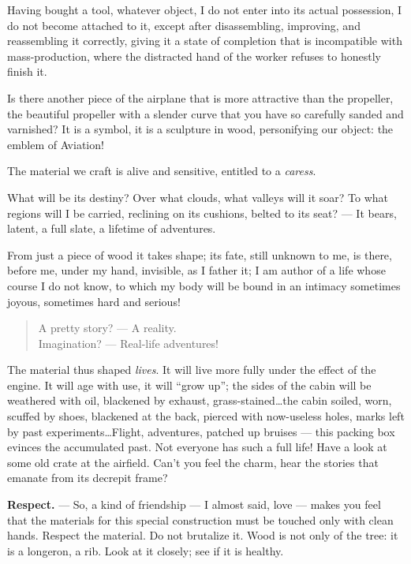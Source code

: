 \documentclass{book}
\begin{document}
Having bought a tool, whatever object, I do not enter into its actual
possession, I do not become attached to it, except after
disassembling, improving, and reassembling it correctly, giving it a
state of completion that is incompatible with mass-production, where
the distracted hand of the worker refuses to honestly finish it.

Is there another piece of the airplane that is more attractive than
the propeller, the beautiful propeller with a slender curve that you
have so carefully sanded and varnished?  It is a symbol, it is a
sculpture in wood, personifying our object: the emblem of Aviation!

The material we craft is alive and sensitive, entitled to a
\textit{caress}.

What will be its destiny? Over what clouds, what valleys will it soar?
To what regions will I be carried, reclining on its cushions, belted
to its seat? --- It bears, latent, a full slate, a lifetime of
adventures.

From just a piece of wood it takes shape; its fate, still unknown to
me, is there, before me, under my hand, invisible, as I father it; I
am author of a life whose course I do not know, to which my body will
be bound in an intimacy sometimes joyous, sometimes hard and serious!

\begin{verse}
  A pretty story? --- A reality.\\
  Imagination? --- Real-life adventures!
\end{verse}

The material thus shaped \textit{lives}. It will live more fully under
the effect of the engine. It will age with use, it will ``grow up'';
the sides of the cabin will be weathered with oil, blackened by
exhaust, grass-stained\ldots the cabin soiled, worn, scuffed by shoes,
blackened at the back, pierced with now-useless holes, marks left by
past experiments\ldots Flight, adventures, patched up bruises --- this
packing box evinces the accumulated past. Not everyone has such a full
life! Have a look at some old crate at the airfield. Can't you feel
the charm, hear the stories that emanate from its decrepit frame?

\textbf{Respect.} --- So, a kind of friendship --- I almost said, love
--- makes you feel that the materials for this special construction
must be touched only with clean hands. Respect the material. Do not
brutalize it.  Wood is not only of the tree: it is a longeron, a
rib. Look at it closely; see if it is healthy.
\end{document}
